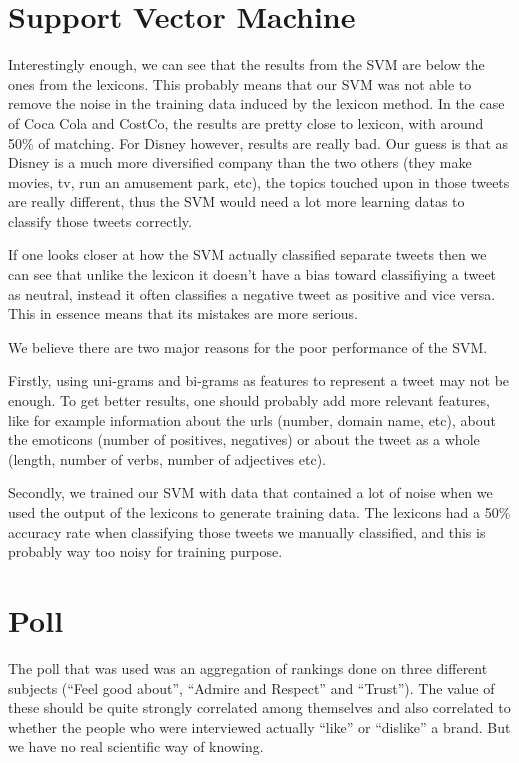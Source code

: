 \documentclass[a4paper,12pt]{report}
\begin{document}
\section{Support Vector Machine}

Interestingly enough, we can see that the results from the SVM are below the ones from the lexicons.
This probably means that our SVM was not able to remove the noise in the training data induced by the lexicon method.
In the case of Coca Cola and CostCo, the results are pretty close to lexicon, with around 50\% of matching.
For Disney however, results are really bad. 
Our guess is that as Disney is a much more diversified company than the two others (they make movies, tv, run an amusement park, etc), the topics touched upon in those tweets are really different, thus the SVM would need a lot more learning datas to classify those tweets correctly.

If one looks closer at how the SVM actually classified separate tweets then we can see that unlike the lexicon it doesn't have a bias toward classifiying a tweet as neutral, instead it often classifies a negative tweet as positive and vice versa.
This in essence means that its mistakes are more serious.

We believe there are two major reasons for the poor performance of the SVM.

Firstly, using uni-grams and bi-grams as features to represent a tweet may not be enough. To get better results, one should probably add more relevant features, like for example information about the urls (number, domain name, etc), about the emoticons (number of positives, negatives) or about the tweet as a whole (length, number of verbs, number of adjectives etc).

Secondly, we trained our SVM with data that contained a lot of noise when we used the output of the lexicons to generate training data. The lexicons had a 50\% accuracy rate when classifying those tweets we manually classified, and this is probably way too noisy for training purpose.

\section{Poll}

The poll that was used was an aggregation of rankings done on three different subjects (“Feel good about”, “Admire and Respect” and “Trust”). The value of these should be quite strongly correlated among themselves and also correlated to whether the people who were interviewed actually “like” or “dislike” a brand. But we have no real scientific way of knowing.
\end{document}

